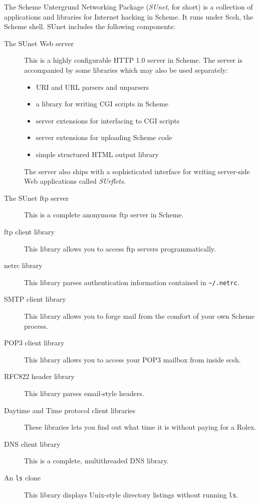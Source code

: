 The Scheme Untergrund Networking Package (\textit{SUnet}, for short)
is a collection of applications and libraries for Internet hacking in
Scheme.  It runs under Scsh, the Scheme shell.  SUnet includes the
following components:
%   
\begin{description}
\item[The SUnet Web server]
  This is a highly configurable HTTP 1.0 server in Scheme.
  The server is accompanied by some libraries which may also
  be used separately:
  \begin{itemize}
  \item URI and URL parsers and unparsers
  \item a library for writing CGI scripts in Scheme
  \item server extensions for interfacing to CGI scripts
  \item server extensions for uploading Scheme code
  \item simple structured HTML output library 
  \end{itemize}

  The server also ships with a sophisticated interface for writing
  server-side Web applications called \textit{SUrflets}.

\item[The SUnet ftp server]
  This is a complete anonymous ftp server in Scheme.
\item[ftp client library] This library allows you to access ftp
  servers programmatically.
\item[netrc library] This library parses authentication information
  contained in \verb|~/.netrc|.
\item[SMTP client library] This library allows you to forge mail from
  the comfort of your own Scheme process.
\item[POP3 client library]
  This library allows you to access your POP3 mailbox from inside scsh.
\item[RFC822 header library] This library parses email-style headers.
\item[Daytime and Time protocol client libraries]
  These libraries lets you find out what time it is without paying for a
  Rolex.
\item[DNS client library] This is a complete, multithreaded DNS
  library.
\item[An \texttt{ls} clone] This library displays Unix-style directory
  listings without running \texttt{ls}.
\end{description}


